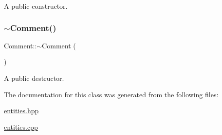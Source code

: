 A public constructor. \mbox{\label{class_comment_aea2c5f6168b3bfdc1dbb7bb99ac44454}} 
\subsubsection{\texorpdfstring{$\sim$\+Comment()}{~Comment()}}
{\footnotesize\ttfamily Comment\+::$\sim$\+Comment (\begin{DoxyParamCaption}{ }\end{DoxyParamCaption})}

A public destructor. 

The documentation for this class was generated from the following files\+:\begin{DoxyCompactItemize}
\item 
\hyperlink{entities_8hpp}{entities.\+hpp}\item 
\hyperlink{entities_8cpp}{entities.\+cpp}\end{DoxyCompactItemize}

